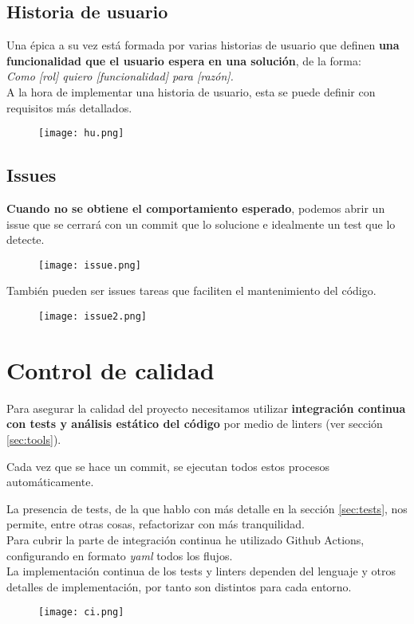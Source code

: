 \subsection{Historia de usuario}
Una épica a su vez está formada por varias historias de usuario que definen \textbf{una funcionalidad que el usuario espera en una solución}, de la forma:\\ \textit{Como [rol] quiero [funcionalidad] para [razón].}\\

A la hora de implementar una historia de usuario, esta se puede definir con requisitos más detallados.

\begin{figure}[H]
	\centering	
	\texttt{[image: hu.png]}
	\end{figure}

\subsection{Issues}
\textbf{Cuando no se obtiene el comportamiento esperado}, podemos abrir un issue que se cerrará con un commit que lo solucione e idealmente un test que lo detecte.

\begin{figure}[H]
	\centering	
	\texttt{[image: issue.png]}
	\end{figure}

	También pueden ser issues tareas que faciliten el mantenimiento del código.

\begin{figure}[H]
	\centering	
	\texttt{[image: issue2.png]}
	\end{figure}


\section{Control de calidad}

Para asegurar la calidad del proyecto necesitamos utilizar \textbf{integración continua con tests y análisis estático del código} por medio de linters (ver sección \ref{sec:tools}).


Cada vez que se hace un commit, se ejecutan todos estos procesos automáticamente.

La presencia de tests, de la que hablo con más detalle en la sección \ref{sec:tests}, nos permite, entre otras cosas, refactorizar con más 
tranquilidad. \\

Para cubrir la parte de integración continua he utilizado Github Actions,  configurando en formato \textit{yaml} todos los flujos.\\
La implementación continua de los tests y linters dependen del lenguaje y otros detalles de implementación, por tanto
son distintos para cada entorno.
\begin{figure}[H]
	\centering	
	\texttt{[image: ci.png]}
	\end{figure}



